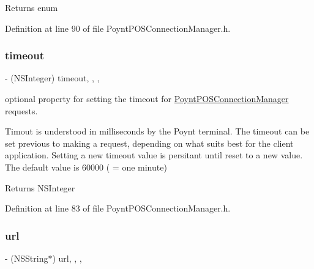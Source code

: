 \begin{DoxyReturn}{Returns}
enum 
\end{DoxyReturn}


Definition at line 90 of file Poynt\+P\+O\+S\+Connection\+Manager.\+h.

\hypertarget{interface_poynt_p_o_s_connection_manager_ad4ac67644bd591b45e7e45448681872d}{}\label{interface_poynt_p_o_s_connection_manager_ad4ac67644bd591b45e7e45448681872d} 
\subsubsection{\texorpdfstring{timeout}{timeout}}
{\footnotesize\ttfamily -\/ (N\+S\+Integer) timeout\hspace{0.3cm}{\ttfamily [read]}, {\ttfamily [write]}, {\ttfamily [nonatomic]}, {\ttfamily [assign]}}



optional property for setting the timeout for \hyperlink{interface_poynt_p_o_s_connection_manager}{Poynt\+P\+O\+S\+Connection\+Manager} requests. 

Timout is understood in milliseconds by the Poynt terminal. The timeout can be set previous to making a request, depending on what suits best for the client application. Setting a new timeout value is persitant until reset to a new value. The default value is 60000 ( = one minute)

\begin{DoxyReturn}{Returns}
N\+S\+Integer 
\end{DoxyReturn}


Definition at line 83 of file Poynt\+P\+O\+S\+Connection\+Manager.\+h.

\hypertarget{interface_poynt_p_o_s_connection_manager_a43481294fa1d2f0ebe7cff14b17726cc}{}\label{interface_poynt_p_o_s_connection_manager_a43481294fa1d2f0ebe7cff14b17726cc} 
\subsubsection{\texorpdfstring{url}{url}}
{\footnotesize\ttfamily -\/ (N\+S\+String$\ast$) url\hspace{0.3cm}{\ttfamily [read]}, {\ttfamily [write]}, {\ttfamily [nonatomic]}, {\ttfamily [strong]}}



